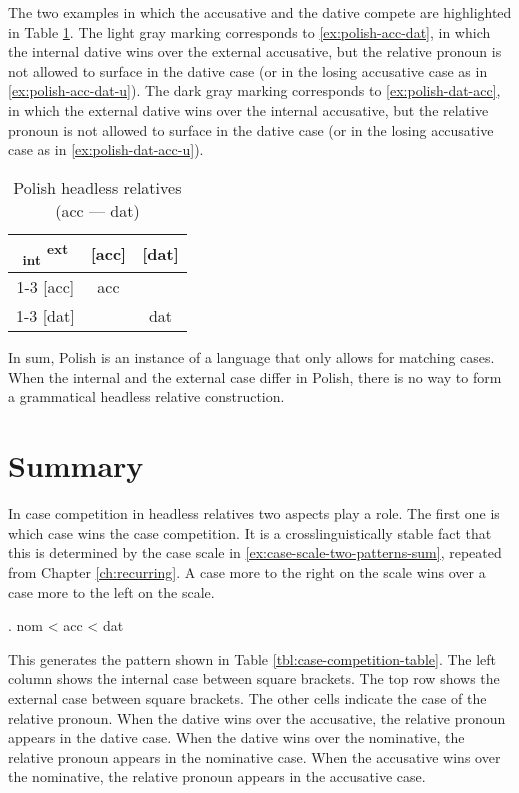 The two examples in which the accusative and the dative compete are highlighted in Table \ref{tbl:summary-polish-acc-dat}.
The light gray marking corresponds to \ref{ex:polish-acc-dat}, in which the internal dative wins over the external accusative, but the relative pronoun is not allowed to surface in the dative case (or in the losing accusative case as in \ref{ex:polish-acc-dat-u}).
The dark gray marking corresponds to \ref{ex:polish-dat-acc}, in which the external dative wins over the internal accusative, but the relative pronoun is not allowed to surface in the dative case (or in the losing accusative case as in \ref{ex:polish-dat-acc-u}).

\begin{table}[ht]
  \center
  \caption{Polish headless relatives (\ac{acc} --- \ac{dat})}
  \begin{tabular}{c|c|c}
    \toprule
    \textsubscript{\ac{int}} \textsuperscript{\ac{ext}}
           & [\ac{acc}]
           & [\ac{dat}]
           \\ \cmidrule{1-3}
       [\ac{acc}]
           & \ac{acc}
           & \cellcolor{DG}{*}
           \\ \cmidrule{1-3}
       [\ac{dat}]
           & \cellcolor{LG}{*}
           & \ac{dat}
           \\
     \bottomrule
  \end{tabular}
    \label{tbl:summary-polish-acc-dat}
\end{table}

In sum, Polish is an instance of a language that only allows for matching cases. When the internal and the external case differ in Polish, there is no way to form a grammatical headless relative construction.

\section{Summary}\label{sec:summary-3-patterns}

In case competition in headless relatives two aspects play a role. The first one is which case wins the case competition. It is a crosslinguistically stable fact that this is determined by the case scale in \ref{ex:case-scale-two-patterns-sum}, repeated from Chapter \ref{ch:recurring}. A case more to the right on the scale wins over a case more to the left on the scale.

\ex. \ac{nom} < \ac{acc} < \ac{dat}\label{ex:case-scale-two-patterns-sum}

This generates the pattern shown in Table \ref{tbl:case-competition-table}. The left column shows the internal case between square brackets. The top row shows the external case between square brackets. The other cells indicate the case of the relative pronoun. When the dative wins over the accusative, the relative pronoun appears in the dative case. When the dative wins over the nominative, the relative pronoun appears in the nominative case. When the accusative wins over the nominative, the relative pronoun appears in the accusative case.

